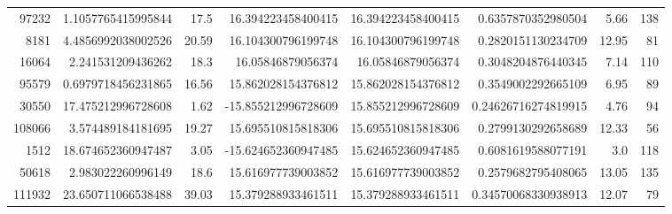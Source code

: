 \documentclass[14pt]{article} %
\begin{document}
\begin{landscape}
\begin{spacing}{1.0}
\begin{table}[h]
\begin{tabular}{|r|r|r|r|r|r|r|r|}
97232&1.1057765415995844&17.5&16.394223458400415&16.394223458400415&0.6357870352980504&5.66&138\\
8181&4.4856992038002526&20.59&16.104300796199748&16.104300796199748&0.2820151130234709&12.95&81\\
16064&2.241531209436262&18.3&16.05846879056374&16.05846879056374&0.3048204876440345&7.14&110\\
95579&0.6979718456231865&16.56&15.862028154376812&15.862028154376812&0.3549002292665109&6.95&89\\
30550&17.475212996728608&1.62&-15.855212996728609&15.855212996728609&0.24626716274819915&4.76&94\\
108066&3.574489184181695&19.27&15.695510815818306&15.695510815818306&0.2799130292658689&12.33&56\\
1512&18.674652360947487&3.05&-15.624652360947485&15.624652360947485&0.6081619588077191&3.0&118\\
50618&2.983022260996149&18.6&15.616977739003852&15.616977739003852&0.2579682795408065&13.05&135\\
111932&23.650711066538488&39.03&15.379288933461511&15.379288933461511&0.34570068330938913&12.07&79\\
\hline 
\end{tabular}
\end{table}

\end{spacing}
\end{landscape}
\newpage
\end{document}
